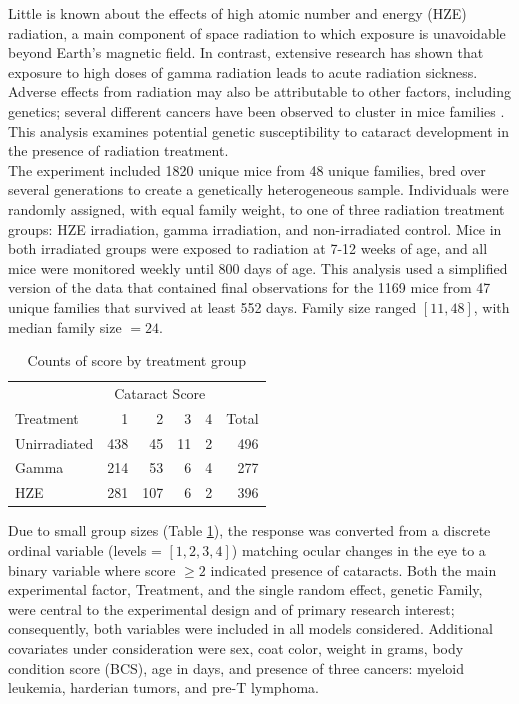 \documentclass[12pt]{article}
\begin{document}
Little is known about the effects of high atomic number and energy (HZE) radiation, a main component of space radiation to which exposure is unavoidable beyond Earth's magnetic field. In contrast, extensive research has shown that exposure to high doses of gamma radiation leads to acute radiation sickness. Adverse effects from radiation may also be attributable to other factors, including genetics; several different cancers have been observed to cluster in mice families \citep{mice2017}. This analysis examines potential genetic susceptibility to cataract development in the presence of radiation treatment.\\
The experiment included 1820 unique mice from 48 unique families, bred over several generations to create a genetically heterogeneous sample. Individuals were randomly assigned, with equal family weight, to one of three radiation treatment groups: HZE irradiation, gamma irradiation, and non-irradiated control. Mice in both irradiated groups were exposed to radiation at 7-12 weeks of age, and all mice were monitored weekly until 800 days of age. This analysis used a simplified version of the data that contained final observations for the 1169 mice from 47 unique families that survived at least 552 days. Family size ranged \([11, 48]\), with median family size \(= 24\).\\

\begin{table}
\centering
\begin{tabular}{lrrrrr}
  \toprule
\multicolumn{1}{c}{ } & \multicolumn{4}{c}{Cataract Score} & \multicolumn{1}{c}{ } \\
\cmidrule(l{3pt}r{3pt}){2-5}
Treatment & 1 & 2 & 3 & 4 & Total \\ 
  \midrule
Unirradiated & 438 &  45 &  11 &   2 & 496 \\ 
  Gamma & 214 &  53 &   6 &   4 & 277 \\ 
  HZE & 281 & 107 &   6 &   2 & 396 \\ 
   \bottomrule
\end{tabular}
\caption{Counts of score by treatment group} 
\label{tab:gtab}
\end{table}

Due to small group sizes (Table \ref{tab:gtab}), the response was converted from a discrete ordinal variable (levels = \([1, 2, 3, 4]\)) matching ocular changes in the eye to a binary variable where score \(\ge 2\) indicated presence of cataracts. Both the main experimental factor, Treatment, and the single random effect, genetic Family, were central to the experimental design and of primary research interest; consequently, both variables were included in all models considered. Additional covariates under consideration were sex, coat color, weight in grams, body condition score (BCS), age in days, and presence of three cancers: myeloid leukemia, harderian tumors, and pre-T lymphoma.
\end{document}
